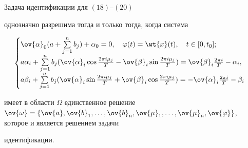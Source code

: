 \begin{thm}


Задача идентификации для $(18)$--$(20)$


однозначно разрешима тогда и только тогда, когда система


\begin{equation}


\begin{cases}


\ov{\alpha}_0(a + \sum\limits^n_{j=1}b_j) + \alpha_0=0, \quad


\varphi(t)=\wt{x}(t), \quad t\in[0,t_0]; \\


a\alpha_i + \sum\limits^n_{j=1}b_j(\ov{\alpha}_i\cos\frac{2\pi


i\mu_j}{T} - \ov{\beta}_i\sin\frac{2\pi i\mu_j}{T}) =


\ov{\beta}_i\frac{2\pi i}{T} - \alpha_i, \\


a\beta_i + \sum\limits^n_{j=1}b_j(\ov{\alpha}_i\sin\frac{2\pi


i\mu_j}{T} + \ov{\beta}_i\cos\frac{2\pi i\mu_j}{T}) =


-\ov{\alpha}_i\frac{2\pi i}{T} - \beta_i


\end{cases}


\end{equation}


имеет в области $\Omega$ единственное решение $\ov{\omega} =


\{\ov{a}, \ov{b}_1,\dotsc, \ov{b}_n,\ov{\mu}_1, \dotsc,


\ov{\mu}_n, \ov{\varphi}\}$, которое и является решением задачи


идентификации.


\end{thm}





